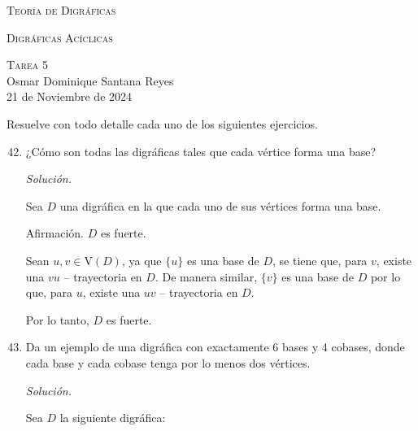 \documentclass[12pt, fleqn]{article}
\newcommand{\V}[1]{\mathrm{V} \! \left( #1 \right)}
\newcommand{\tray}[2]{$ #1 #2 $ -- trayectoria}
\begin{document}
	\begin{center}
		{\huge \textsc{Teoría de Digráficas}}
	
		{\Large \textsc{Digráficas Acíclicas}}
	
		{\Large \textsc{Tarea 5}} \\
		Osmar Dominique Santana Reyes \\
		21 de Noviembre de 2024
	\end{center} \vspace{3mm}

	Resuelve con todo detalle cada uno de los siguientes ejercicios.

	\begin{enumerate}
		\setcounter{enumi}{41}
		\item ¿Cómo son todas las digráficas tales que cada vértice forma una base?
		
		\emph{Solución.}

		Sea $D$ una digráfica en la que cada uno de sus vértices forma una base.

		Afirmación. $D$ es fuerte.

		Sean $ u,v \in \V{D} $, ya que $ \lbrace u \rbrace $ es una base de $D$, se tiene que, para $v$, existe una \tray{v}{u} en $D$. De manera similar, $ \lbrace v \rbrace $ es una base de $D$ por lo que, para $u$, existe una \tray{u}{v} en $D$.

		Por lo tanto, $D$ es fuerte. 
		
		\item Da un ejemplo de una digráfica con exactamente 6 bases y 4 cobases, donde cada base y cada cobase tenga por lo menos dos vértices.
		
		\emph{Solución.}

		Sea $D$ la siguiente digráfica:


\end{enumerate}
\end{document}
